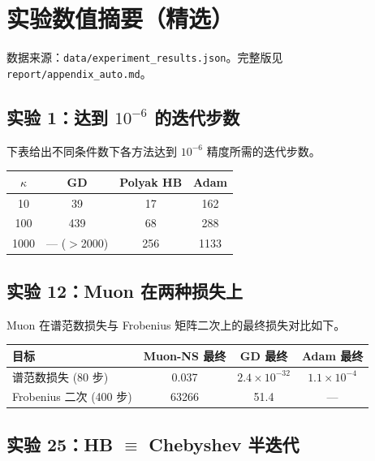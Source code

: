 \section{实验数值摘要（精选）}
\label{app:data}

数据来源：\texttt{data/experiment\_results.json}。完整版见 \texttt{report/appendix\_auto.md}。

\subsection{实验 1：达到 $10^{-6}$ 的迭代步数}
\label{app:exp1}

\noindent 下表给出不同条件数下各方法达到 $10^{-6}$ 精度所需的迭代步数。
\begin{center}
  \vspace{0.5em}
  \begin{tabular}{@{}cccc@{}}
    \toprule
    $\kappa$ & GD & Polyak HB & Adam \\
    \midrule
    10   & 39  & 17  & 162 \\
    100  & 439 & 68  & 288 \\
    1000 & --- ($>$2000) & 256 & 1133 \\
    \bottomrule
  \end{tabular}
  \vspace{0.5em}
\end{center}

\subsection{实验 12：Muon 在两种损失上}
\label{app:exp12}

\noindent Muon 在谱范数损失与 Frobenius 矩阵二次上的最终损失对比如下。
\begin{center}
  \vspace{0.5em}
  \begin{tabular}{@{}lccc@{}}
    \toprule
    目标 & Muon-NS 最终 & GD 最终 & Adam 最终 \\
    \midrule
    谱范数损失 (80 步)      & 0.037   & $2.4\times 10^{-32}$ & $1.1\times 10^{-4}$ \\
    Frobenius 二次 (400 步) & 63266   & 51.4                 & --- \\
    \bottomrule
  \end{tabular}
  \vspace{0.5em}
\end{center}

\subsection{实验 25：HB $\equiv$ Chebyshev 半迭代}
\label{app:exp25}

